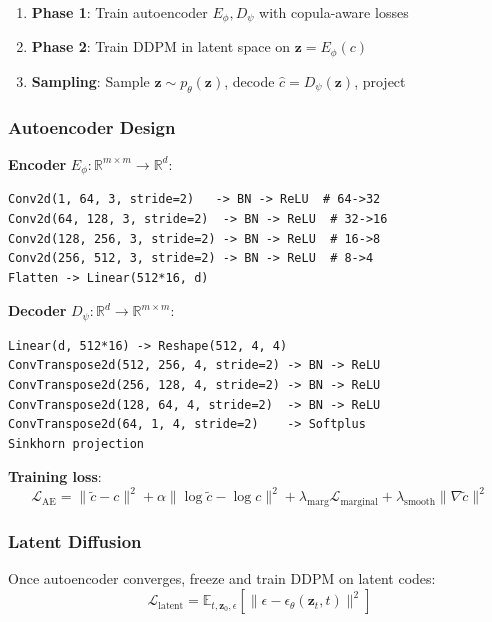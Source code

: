 \documentclass[11pt]{article}
\begin{document}
\begin{enumerate}
    \item \textbf{Phase 1}: Train autoencoder $E_\phi, D_\psi$ with copula-aware losses
    \item \textbf{Phase 2}: Train DDPM in latent space on $\mathbf{z} = E_\phi(c)$
    \item \textbf{Sampling}: Sample $\mathbf{z} \sim p_\theta(\mathbf{z})$, decode $\hat{c} = D_\psi(\mathbf{z})$, project
\end{enumerate}

\subsubsection{Autoencoder Design}

\textbf{Encoder} $E_\phi: \mathbb{R}^{m \times m} \to \mathbb{R}^d$:
\begin{verbatim}
Conv2d(1, 64, 3, stride=2)   -> BN -> ReLU  # 64->32
Conv2d(64, 128, 3, stride=2)  -> BN -> ReLU  # 32->16
Conv2d(128, 256, 3, stride=2) -> BN -> ReLU  # 16->8
Conv2d(256, 512, 3, stride=2) -> BN -> ReLU  # 8->4
Flatten -> Linear(512*16, d)
\end{verbatim}

\textbf{Decoder} $D_\psi: \mathbb{R}^d \to \mathbb{R}^{m \times m}$:
\begin{verbatim}
Linear(d, 512*16) -> Reshape(512, 4, 4)
ConvTranspose2d(512, 256, 4, stride=2) -> BN -> ReLU
ConvTranspose2d(256, 128, 4, stride=2) -> BN -> ReLU
ConvTranspose2d(128, 64, 4, stride=2)  -> BN -> ReLU
ConvTranspose2d(64, 1, 4, stride=2)    -> Softplus
Sinkhorn projection
\end{verbatim}

\textbf{Training loss}:
\begin{equation}
\mathcal{L}_{\text{AE}} = \|\tilde{c} - c\|^2 + \alpha \|\log \tilde{c} - \log c\|^2 + \lambda_{\text{marg}} \mathcal{L}_{\text{marginal}} + \lambda_{\text{smooth}} \|\nabla \tilde{c}\|^2
\end{equation}

\subsubsection{Latent Diffusion}

Once autoencoder converges, freeze and train DDPM on latent codes:
\begin{equation}
\mathcal{L}_{\text{latent}} = \mathbb{E}_{t, \mathbf{z}_0, \epsilon} \left[ \|\epsilon - \epsilon_\theta(\mathbf{z}_t, t)\|^2 \right]
\end{equation}
\end{document}
